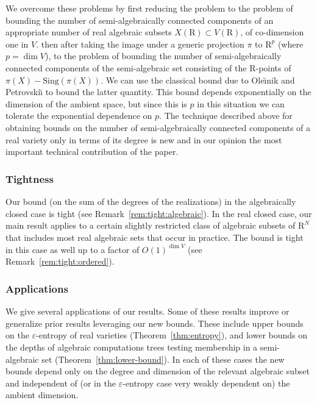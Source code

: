 \documentclass[10pt]{amsart}
\theoremstyle{definition}
\theoremstyle{remark}
\numberwithin{equation}{section}
\newcommand {\R} {\mathrm{R}}
\newcommand {\eps} {{\varepsilon}}
\newcommand{\Sing}{\mathrm{Sing}}
\begin{document}
We overcome these problems by first reducing the problem to the problem of bounding the number of semi-algebraically connected components of an appropriate number of real algebraic subsets $X(\R) \subset V(\R)$,
of co-dimension one in $V$.
then after taking the image under a generic projection $\pi$ to $\R^p$ (where 
$p= \dim V$), to the problem of bounding the number of semi-algebraically connected components of the semi-algebraic set consisting of the $\R$-points of $\pi(X) - \Sing(\pi(X))$. We can use the classical bound due to 
Ole{\u\i}nik and Petrovski{\u\i} \cite{OP} to bound the latter quantity. This bound depends exponentially on the dimension of the ambient space, but since  this is $p$ in this situation we can tolerate the exponential dependence
on $p$. The technique described above for obtaining bounds on the number of semi-algebraically connected components of a real variety only in terms of its degree is new and in our opinion the most important technical contribution of the paper.


\subsubsection{Tightness}
\label{subsubsec:tightness}
Our bound (on the sum of the degrees of the realizations) in the algebraically closed case is tight  (see Remark~\ref{rem:tight:algebraic}).
In the real closed case, our main result applies to a certain slightly restricted class of algebraic subsets of $\R^N$  
that includes most real algebraic sets that occur in practice. 
The bound is tight in this case as well up to a factor of $O(1)^{\dim V}$
(see Remark~\ref{rem:tight:ordered}).


\subsubsection{Applications}
\label{subsubsec:applications}
We give several applications of our results. Some of these results 
improve or generalize prior results leveraging our new bounds.
These include upper bounds on 
the $\eps$-entropy  of real varieties (Theorem~\ref{thm:entropy}),
and lower bounds on the depths of algebraic computations trees 
testing membership in a semi-algebraic set (Theorem~\ref{thm:lower-bound}). In each of these cases the new bounds depend only on the degree and dimension of the relevant algebraic subset and independent of
(or in the $\eps$-entropy case very weakly dependent on) the ambient dimension.
\end{document}
